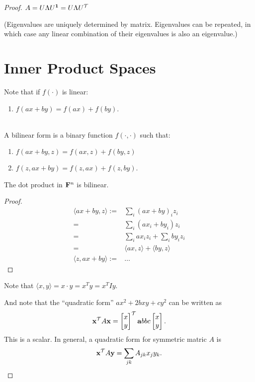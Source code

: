 \begin{proof}
$A = U\Lambda U^{\mathbf 1} = U\Lambda U^\mathcal T$

(Eigenvalues are uniquely determined by matrix. Eigenvalues can be repeated, in which case any linear combination of their
eigenvalues is also an eigenvalue.)

\section{Inner Product Spaces}

Note that if $f(\cdot)$ is linear:
\begin{enumerate}
\item $f(ax + by) = f(ax) + f(by)$.
\end{enumerate}

\begin{definition*}~\\
  A bilinear form is a binary function $f(\cdot, \cdot)$ such that:
  \begin{enumerate}
  \item $f(ax + by, z) = f(ax, z) + f(by, z)$
  \item $f(z, ax + by) = f(z, ax) + f(z, by)$.
  \end{enumerate}
\end{definition*}


\begin{claim*}
  The dot product in $\mathbf{F}^n$ is bilinear.
\end{claim*}

\begin{proof}
  \begin{align*}
    \langle ax + by , z \rangle :=& \sum_i (ax + by)_iz_i\\
                                 =& \sum_i (ax_i + by_i)z_i\\
                                 =& \sum_i ax_iz_i + \sum_i by_iz_i\\
                                 =& \langle ax, z \rangle + \langle by, z \rangle\\
    \langle z, ax + by \rangle  :=& \ldots
  \end{align*}
\end{proof}

Note that $\langle x, y \rangle = x \cdot y = x^Ty = x^TIy$.

And note that the ``quadratic form'' $ax^2 + 2bxy + cy^2$ can be written as
\begin{align*}
\mathbf x^\mathcal T A \mathbf x = \begin{bmatrix}x\\y\end{bmatrix}^\mathcal T \mathbf{a}{b}
                                {b}{c} \begin{bmatrix}x\\y\end{bmatrix}.
\end{align*}
This is a scalar. In general, a quadratic form for symmetric matric $A$ is
\begin{align*}
\mathbf x^\mathcal T A \mathbf y = \sum_{jk}A_{jk}x_jy_k.
\end{align*}


\end{proof}
